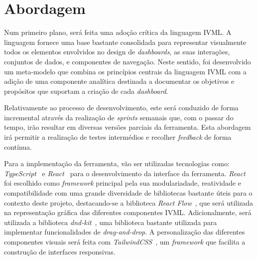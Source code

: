 
\section{Abordagem} %
\label{sec:dashboard_abordagem}

Num primeiro plano, será feita uma adoção crítica da linguagem \gls{IVML}. A linguagem fornece uma base bastante consolidada para representar visualmente todos os elementos envolvidos no design de \textit{dashboards}, as suas interações, conjuntos de dados, e componentes de navegação. Neste sentido, foi desenvolvido um meta-modelo que combina os princípios centrais da linguagem \gls{IVML} com a adição de uma componente analítica destinada a documentar os objetivos e propósitos que suportam a criação de cada \textit{dashboard}.

Relativamente ao processo de desenvolvimento, este será conduzido de forma incremental através da realização de \textit{sprints} semanais que, com o passar do tempo, irão resultar em diversas versões parciais da ferramenta. Esta abordagem irá permitir a realização de testes intermédios e recolher \textit{feedback} de forma contínua.

Para a implementação da ferramenta, vão ser utilizadas tecnologias como: \textit{TypeScript}~\cite{typescript} e \textit{React}~\cite{react} para o desenvolvimento da interface da ferramenta. \textit{React} foi escolhido como \textit{framework} principal pela sua modulariadade, reatividade e compatibilidade com uma grande diversidade de bibliotecas bastante úteis para o contexto deste projeto, destacando-se a biblioteca \textit{React Flow}~\cite{reactflow}, que será utilizada na representação gráfica das diferentes componentes \gls{IVML}. Adicionalmente, será utilizada a biblioteca \textit{dnd-kit}~\cite{dndkit}, uma biblioteca bastante utilizada para implementar funcionalidades de \textit{drag-and-drop}. A personalização das diferentes componentes visuais será feita com \textit{TailwindCSS}~\cite{tailwindcss}, um \textit{framework} que facilita a construção de interfaces responsivas.

